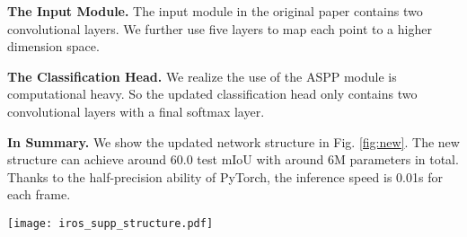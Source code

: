 \documentclass[letterpaper, 10 pt, conference]{ieeeconf}
\newcommand{\bfsection}[1]{\vspace*{0.1cm}\noindent\textbf{#1.}}
\begin{document}
\bfsection{The Input Module} The input module in the original paper contains two  convolutional layers. We further use five layers to map each point to a higher dimension space.

\bfsection{The Classification Head} We realize the use of the ASPP module is computational heavy. So the updated classification head only contains two  convolutional layers with a final softmax layer.

\bfsection{In Summary} We show the updated network structure in Fig. \ref{fig:new}. The new structure can achieve around 60.0 test mIoU with around 6M parameters in total. Thanks to the half-precision ability of PyTorch, the inference speed is 0.01s for each frame.

\begin{figure*}[h]
\texttt{[image: iros\_supp\_structure.pdf]}
    \caption{Illustration of our updated network structure. The input module has two  layers mapping each point to a high dimensional space. The backbone can be any regular standard network, like ResNet-34 used in this paper. The FID module upsamples all low-resolution feature maps to the original size and concatenates them together. The last classification head takes in the merged large tensor and outputs the label of each point.   }
    \label{fig:new}
    \vspace{-5mm}
\end{figure*}
\end{document}
